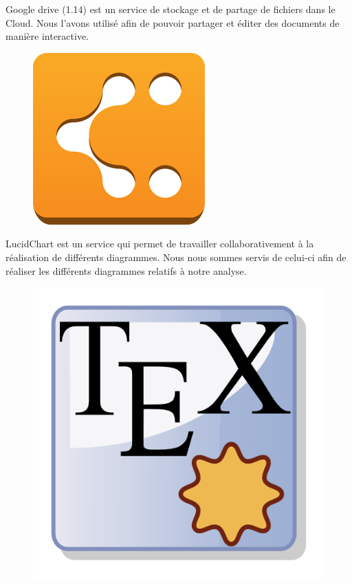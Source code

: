 \documentclass[17pts]{report}
\begin{document}
Google drive (1.14) est un service de stockage et de partage de fichiers dans
le Cloud. Nous l'avons utilisé afin de pouvoir partager et éditer des documents
de manière interactive.\\

\begin{figure}[H]
    \includegraphics[scale=0.15]{illustrations/lucidchart.png}
    \centering
\end{figure}

LucidChart est un service qui permet de travailler collaborativement à la
réalisation de différents diagrammes. Nous nous sommes servis de celui-ci afin
de réaliser les différents diagrammes relatifs à notre analyse.\\

\begin{figure}[H]
    \includegraphics[scale=1.1]{illustrations/texmaker.png}
    \centering
\end{figure}
\end{document}
